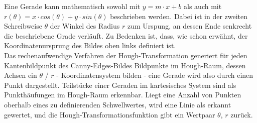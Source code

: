\vspace{0.8cm}

Eine Gerade kann  mathematisch sowohl mit $y = m \cdot x + b$ als auch mit 
$r(\theta) = x \cdot cos(\theta) + y \cdot sin(\theta)$ beschrieben werden. 
Dabei ist in der zweiten Schreibweise $\theta$ der  Winkel des Radius $r$ zum 
Urspung, an dessen Ende senkrecht die beschriebene Grade verläuft. Zu Bedenken 
ist, dass, wie schon erwähnt, der Koordinatenursprung des Bildes oben links 
definiert ist.\\
Das rechenaufwendige Verfahren der Hough-Transformation generiert für jeden
Kantenbildpunkt des Canny-Edges-Bildes Bildpunkte im Hough-Raum, dessen Achsen
ein $\theta$ / $r$ - Koordinatensystem bilden - eine Gerade wird also durch
einen Punkt dargestellt.  Teilstücke einer Geraden im kartesisches System
sind als Punkthäufungen im Hough-Raum erkennbar. Liegt eine Anzahl von
Punkten oberhalb eines zu definierenden Schwellwertes, wird eine Linie als 
erkannt gewertet, und die Hough-Transformationsfunktion gibt ein Wertpaar 
$\theta$, $r$ zurück.
